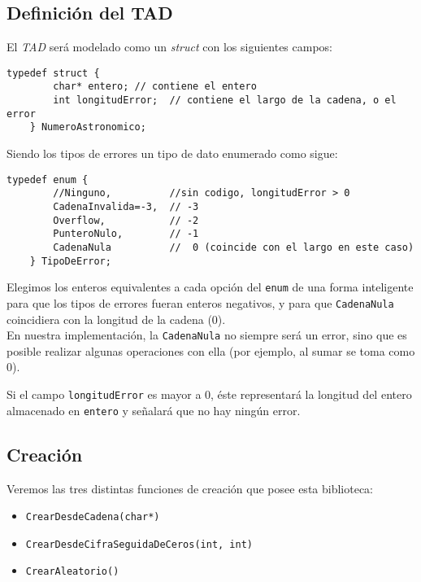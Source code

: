 \documentclass[a4paper, 12pt]{article}
\begin{document}
\subsection{Definición del TAD} \label{definicion-TAD}
\bigbreak
El \emph{TAD} será modelado como un \emph{struct} con los siguientes campos:

\begin{lstlisting}[style=C]
    typedef struct {
        char* entero; // contiene el entero
        int longitudError;  // contiene el largo de la cadena, o el error
    } NumeroAstronomico;
\end{lstlisting}

Siendo los tipos de errores un tipo de dato enumerado como sigue:

\begin{lstlisting}[style=C]
    typedef enum {
        //Ninguno,          //sin codigo, longitudError > 0
        CadenaInvalida=-3,  // -3
        Overflow,           // -2
        PunteroNulo,        // -1
        CadenaNula          //  0 (coincide con el largo en este caso)
    } TipoDeError;
\end{lstlisting}

Elegimos los enteros equivalentes a cada opción del \verb|enum| de una forma inteligente para que los tipos de errores fueran enteros negativos, y para que \verb|CadenaNula| coincidiera con la longitud de la cadena ($0$). \\
En nuestra implementación, la \verb|CadenaNula| no siempre será un error, sino que es posible realizar algunas operaciones con ella (por ejemplo, al sumar se toma como 0).

Si el campo \verb|longitudError| es mayor a $0$, éste representará la longitud del entero almacenado en \verb|entero| y señalará que no hay ningún error.

\subsection{Creación} \label{creacion}
\bigbreak
Veremos las tres distintas funciones de creación que posee esta biblioteca:

\begin{itemize}
    \item \texttt{CrearDesdeCadena(char*)}
    \item \texttt{CrearDesdeCifraSeguidaDeCeros(int, int)}
    \item \texttt{CrearAleatorio()}
\end{itemize}
\end{document}
